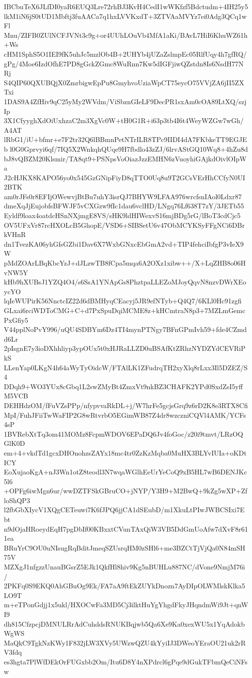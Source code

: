 IBCbuTeX6JLfDI0yaR6EUQ3Lre72rhBJ3KvH4CedI1wWKfzf5Bdctudm+4IH25y5
lkM1iN6jS0tUD1Mbftj3fuAACa7q1hxLVVKxdT+3ZTVAaMVYz7ei0Adg3QCq1wFl
Mnu/ZIFB0ZUlNCFJVNt3c9g+or4UUhLOuVb4MfA1aKi/BAvL7HiI6KhuWZ61h+Ws
cHM1SphS5O1IEI9fK5uhJc5mzlOb4B+2UHYb4jUZaZslmpEc05RlfUqy4h7gfRQ/
gPg/4Moe6IzdOfhE7PD8gGckZGmc8WuRnn7Kw5dIGFjiwQZstdn8Is6NsdH77NRj
S4QIP60QXUBQjX0ZmrbigwEpPu8GmyhvoUziaWpCT75eycO75VVjZA6jII5ZXTxi
1DAS9A4ZfHiv9qC25yMy2WVdm/ViSbznGIeLF9DecPR1sxAm0cOA89LtXQ/szjIp
3X1CfyyghXdOiUxhzaC2m3XgVc0W+tH0G1R+i63p3tb4I6t4WeyWZGw7wGh/A4AT
lRbG1/iU+bfmr+e7F2tr32Q6lBBmnPetNTrILR8TPc9IIDI4dA7FKbkeTT9EGJEb
l0G0Gprvyi6qf/7IQ5X2WnkqhQUqe9H7fbdlo43zZJ/6lrvAStGQ10Wq8+4hZu8d
bJ8vQBZM20Klsmir/TA8qt9+PSNpsVoOiazJzzEMHN6zVuoyhiGAjkdOivlOIpWa
J2cHJKX8KAPO56yo0x545GzGNipFiyD8qTTO0Uq8u9T2GCsVErHhCCfyN0UI2BTK
am0rJFs0r8EFIjOWewvjBtBu7uhY3isrQJ7BHYW9LFAA976wrcfsnIAol0Ldxr87
dmeXqJjEujobfsBFWJF5vCXGzw9fIc1dau6vclHD/LNgq76Lf638T7zY/3JETb55
Eyldf9loax4oatdcHSnNXjmgE8VS/sHK9ldHIWexvS16mjBDg5rG/lBoT3cdCjc5
OV5UFxVr87rcHXOLcB5GhopE/VSD6+SIBSetU6v47ObMCYKSyFFgNCi6DBrkVHnR
dn1TvezKA06yhGfsGZbi1Dav6X7WxbGNxcEbGmA2vd+TIP4fehciIbfgP3vIeX9W
pMdZOArLBqKbcYzJ+dJLzwTB8fCpa5mqa6A2OXz1xibw++/X+LqZHB8o06HvNW5Y
kHb9hXUBsJ1YZQ4O4/s6SsA1YNApGs8PhztpaLLEZoMJoyQqvN8nzvDWrXEoycYO
lqIeWUPirK56NnctcIZ22d6dBMHyqCEacyj5JR9efNTyb+Q4Q7/6KLl0Hc91zgfi
GLxai6rciWDToCMG+C+d7PxSpuDqiMCME8z+kHCmtraN8p3+7MZLmGemcPxGfiy5
V44pplNoPvY996/uQU4SDBYm6Dz4TI4mynPTNgy7BFnGPmIvh59+fde4CZmdd6Lr
2pIsgnE7y3ioDXhhliyp3ypOUx5t0xHJRaLLZD0uBSAfKtZRhzNYDZYdCEVRiPkS
LLenYap0LKgN4h64aWyTyOidcW/FTAlLK1ZFudrqTH2xyXlq8rLxx3Il5DZEZ/S4
DDqh9+WO3YUx8cGbq1L2swZMyBt4ZmxVt9nkBZ3CHAFK2YPd0SxdZsI5yffM5VCB
DEHHdzOM/fFuVZsPPp/nfypvvaRkDL+j/W7hrFe5gcjsGrq9z6rD2K8e3RTX8Cfi
MpI/FuhJFiiTwWaFIP2G8wRtvrbO5EGimWB87Z4dr8wzczniCQVl4AMK/YCFs4sP
1BVRebXtTq3om41MOMz8FcpmWDOV6EPaDQ6Jv4foGoc/z20i9tmvt/LRzOQGlK0D
em+4+vkdTd1gcxDHOnohzsZAYx18mc4tr0ZzKzMqba0MuHX3BLYvIUIa+oKDtICY
EoXujaoKgA+nJ3Wn1otZ8teodl3N7wqaWGlhEeUrYeCoQ9xB5HL7wB6DENJKc5l6
+OPFg6iwMgn6ur/wwDZTFSkGBruCO+jNYP/Y3H9+M2BwQ+9kZg5wXP+ZfloShQP3
l2fbGbXIycV1XQgCETeuwi7K6fJPQ6jjCA1dSEubD/m1XkuLtPIwJWBCSIxi7Ebt
n9dOjaHRoeydEqH7pgDbIf00KBxxtCVunTAxQiW3VB5DdGmUoAfw7dXvF8r611ea
BRuYrC9OU0uNIsugRqBditJmeqSZUsrqHM0zSHl6+me3BZCtTjVjQa0N84mSH75V
MZXgJ1nfgzzUnauBGsrZ5EJk1QkfHl8hiv9Kg5nBUHLu887NC/dVone9NmjM76i/
2PKFq0S9EKQ0AhGBuOg9Ek/FA7aA9ftEkZUYkDnozn7AyDIpOLWMlskKlka5LO9T
m+eTPonGdjj1x5ukl/HXOCwFa3MD5Cj3ilktHuYgYhgdFkyJHqndmWi9Jt+qnWI9
dh815CfzpcjDMNULRrAdCuhddsRNUKBqjwb5Qa6Xe9Ka0xexWU5x1YqAdokbWgWS
MaQkC9TgkNzKWy1F832jLW3XVy5UWzwQZU4kYyiIJ3DWeoYEraOU21uk2rRV3fdq
es3hgta7PlWfDEkOrFUGxbb2Om/Itu6D8Y4nXPdrcl6gPqe9dGukTFbmQeCiNFsw
